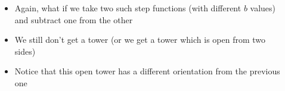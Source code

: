 \begin{frame}
	\begin{columns}
		\begin{overlayarea}{\textwidth}{\textheight}
		\end{overlayarea}
		\begin{overlayarea}{\textwidth}{\textheight}
			\begin{itemize}\justifying
				\item<1-> Again, what if we take two such step functions (with different $b$ values) and subtract one from the other
				\item<4-> We still don't get a tower (or we get a tower which is open from two sides)
				\item<5-> Notice that this open tower has a different orientation from the previous one
			\end{itemize}
		\end{overlayarea}
	\end{columns}
\end{frame}


